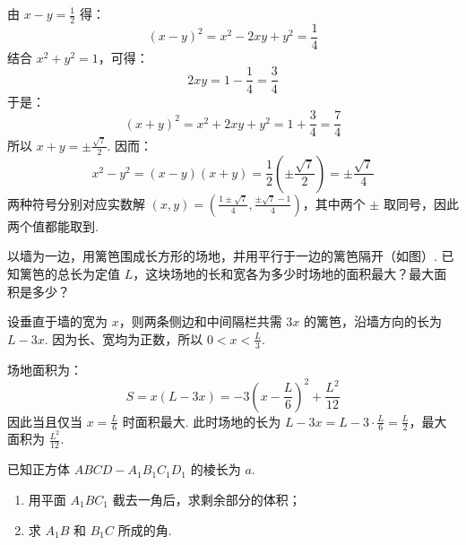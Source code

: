 \begin{solution}
由 \(x-y=\frac12\) 得：
\[
 (x-y)^2=x^2-2xy+y^2=\frac14
\]
结合 \(x^2+y^2=1\)，可得：
\[
 2xy=1-\frac14=\frac34
\]
于是：
\[
 (x+y)^2=x^2+2xy+y^2=1+\frac34=\frac74
\]
所以 \(x+y=\pm\frac{\sqrt7}{2}\). 因而：
\[
 x^2-y^2=(x-y)(x+y)=\frac12\left(\pm\frac{\sqrt7}{2}\right)=\pm\frac{\sqrt7}{4}
\]
两种符号分别对应实数解 \(\displaystyle (x,y)=\left(\frac{1\pm\sqrt7}{4},\frac{\pm\sqrt7-1}{4}\right)\)，其中两个 \(\pm\) 取同号，因此两个值都能取到.
\end{solution}

\begin{problem}

以墙为一边，用篱笆围成长方形的场地，并用平行于一边的篱笆隔开（如图）. 已知篱笆的总长为定值 \(L\)，这块场地的长和宽各为多少时场地的面积最大？最大面积是多少？

\end{problem}

\begin{solution}
设垂直于墙的宽为 \(x\)，则两条侧边和中间隔栏共需 \(3x\) 的篱笆，沿墙方向的长为 \(L-3x\). 因为长、宽均为正数，所以 \(0<x<\frac{L}{3}\).

场地面积为：
\[
 S=x(L-3x)=-3\left(x-\frac{L}{6}\right)^2+\frac{L^2}{12}
\]
因此当且仅当 \(x=\frac{L}{6}\) 时面积最大. 此时场地的长为 \(L-3x=L-3\cdot\frac{L}{6}=\frac{L}{2}\)，最大面积为 \(\frac{L^2}{12}\).
\end{solution}

\begin{problem}

已知正方体 \(ABCD-A_1B_1C_1D_1\) 的棱长为 \(a\).

\begin{enumerate}
\item 用平面 \(A_1BC_1\) 截去一角后，求剩余部分的体积；
\item 求 \(A_1B\) 和 \(B_1C\) 所成的角.
\end{enumerate}
\end{problem}

